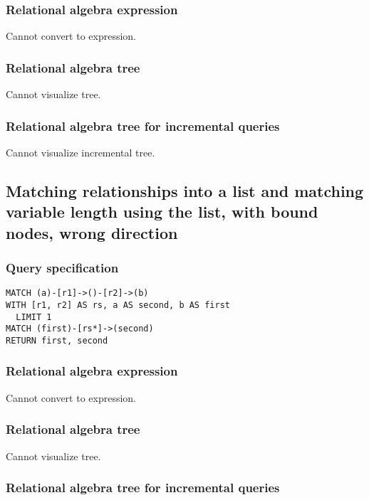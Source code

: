\subsubsection*{Relational algebra expression}

Cannot convert to expression.

\subsubsection*{Relational algebra tree}

Cannot visualize tree.

\subsubsection*{Relational algebra tree for incremental queries}

Cannot visualize incremental tree.

\subsection{Matching relationships into a list and matching variable length using the list, with bound nodes, wrong direction}

\subsubsection*{Query specification}

\begin{lstlisting}
MATCH (a)-[r1]->()-[r2]->(b)
WITH [r1, r2] AS rs, a AS second, b AS first
  LIMIT 1
MATCH (first)-[rs*]->(second)
RETURN first, second
\end{lstlisting}

\subsubsection*{Relational algebra expression}

Cannot convert to expression.

\subsubsection*{Relational algebra tree}

Cannot visualize tree.

\subsubsection*{Relational algebra tree for incremental queries}

